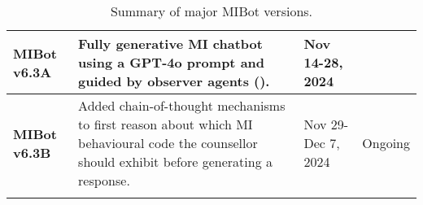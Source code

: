 \begin{table}[!h]
\begin{tabularx}{\textwidth}{@{}>{\raggedright\arraybackslash}p{}YYY@{}}
		\hline
		\textbf{MIBot v6.3A} &
		Fully generative MI chatbot using a GPT-4o prompt and guided by observer agents ().
		                     & Nov 14-28, 2024                                                                                                                                                                                & \citet{mahmood-etal-2025-fully}                            \\
		\hline
		\textbf{MIBot v6.3B} & Added chain-of-thought mechanisms to first reason about which MI behavioural code the counsellor should exhibit before generating a response.                                                  & Nov 29-Dec 7, 2024              & Ongoing                  \\
		\bottomrule
        \end{tabularx}
        \endgroup
	\caption[Summary of major MIBot versions]{Summary of major MIBot versions.}
\end{table}